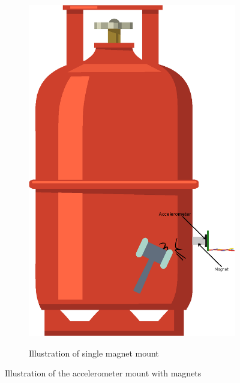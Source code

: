 \begin{figure}[]
\begin{subfigure}{0.3\textwidth}
        \includegraphics[width=\linewidth]{Chapters/4CHP/Figures/AccSMagnet.eps}
        \caption{Illustration of single magnet mount}{}
        \label{subfig:mounMagnetsingle}
    \end{subfigure}
    \caption{Illustration of the accelerometer mount with magnets}{}
    \label{fig:mounMagnet}
\end{figure}
%

